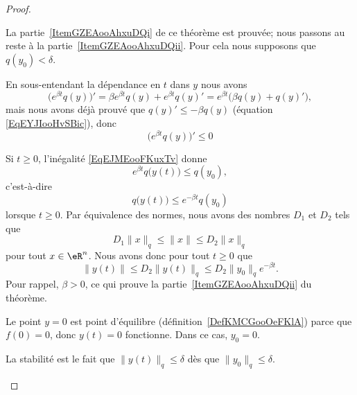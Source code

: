\begin{proof}
\begin{subproof}
		La partie~\ref{ItemGZEAooAhxuDQi} de ce théorème est prouvée; nous passons au reste à la partie~\ref{ItemGZEAooAhxuDQii}. Pour cela nous supposons que \( q(y_0)<\delta\).


		En sous-entendant la dépendance en \( t\) dans \( y\) nous avons
		\begin{equation}
			\Big(  e^{\beta t}q(y) \Big)'=\beta e^{\beta t}q(y)+ e^{\beta t}q(y)'= e^{\beta t}\big( \beta q(y)+q(y)' \big),
		\end{equation}
		mais nous avons déjà prouvé que \( q(y)'\leq -\beta q(y)\) (équation \eqref{EqEYJIooHvSBic}), donc
		\begin{equation}    \label{EqEJMEooFKuxTv}
			\Big(  e^{\beta t}q(y) \Big)'\leq 0
		\end{equation}

		Si \(t\geq 0\), l'inégalité \eqref{EqEJMEooFKuxTv} donne
		\begin{equation}
			e^{\beta t}q\big( y(t) \big)\leq q(y_0),
		\end{equation}
		c'est-à-dire
		\begin{equation}
			q\big( y(t) \big)\leq  e^{-\beta t}q(y_0)
		\end{equation}
		lorsque \( t\geq 0\). Par équivalence des normes, nous avons des nombres \( D_1\) et \( D_2\) tels que
		\begin{equation}
			D_1\| x \|_q\leq \| x \|\leq D_2\| x \|_q
		\end{equation}
		pour tout \( x\in \eR^n\). Nous avons donc pour tout \( t\geq 0\) que
		\begin{equation}
			\| y(t) \|\leq D_2\| y(t) \|_q\leq D_2\| y_0 \|_q e^{-\beta t}.
		\end{equation}
		Pour rappel, \( \beta>0\), ce qui prouve la partie~\ref{ItemGZEAooAhxuDQii} du théorème.


		Le point \( y=0\) est point d'équilibre (définition~\ref{DefKMCGooOeFKlA}) parce que \( f(0)=0\), donc \( y(t)=0\) fonctionne. Dans ce cas, \( y_0=0\).

		\spitem[Stabilité]

		La stabilité est le fait que \( \| y(t) \|_q\leq \delta\) dès que \( \| y_0 \|_q\leq \delta\).

	\end{subproof}
\end{proof}


